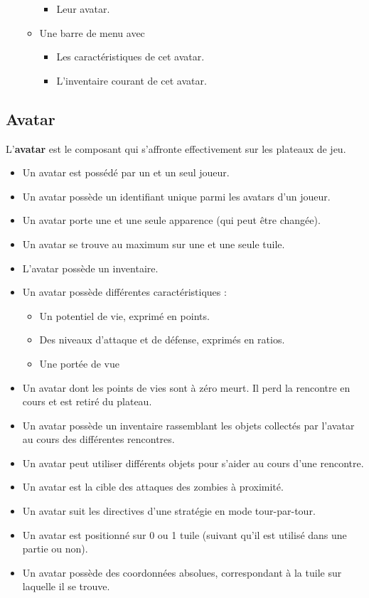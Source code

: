 \begin{itemize}
\begin{itemize}
\begin{itemize}
                        \item Leur avatar.
                    \end{itemize}
                \item Une barre de menu avec
                    \begin{itemize}
                        \item Les caractéristiques de cet avatar.
                        \item L'inventaire courant de cet avatar.
                    \end{itemize}
            \end{itemize}
    \end{itemize}
    
\subsection{Avatar}
L'\textbf{avatar} est le composant qui s'affronte effectivement sur les plateaux de jeu.
    \begin{itemize}
        \item Un avatar est possédé par un et un seul joueur.
        \item Un avatar possède un identifiant unique parmi les avatars d'un joueur.
        \item Un avatar porte une et une seule apparence (qui peut être changée).
        \item Un avatar se trouve au maximum sur une et une seule tuile.
        \item L'avatar possède un inventaire.
        \item Un avatar possède différentes caractéristiques : 
        \begin{itemize}
            \item Un potentiel de vie, exprimé en points.
            \item Des niveaux d'attaque et de défense, exprimés en ratios.
            \item Une portée de vue
        \end{itemize}
        \item Un avatar dont les points de vies sont à zéro meurt. Il perd la rencontre en cours et est retiré du plateau.
        \item Un avatar possède un inventaire rassemblant les objets collectés par l'avatar au cours des différentes rencontres.
        \item Un avatar peut utiliser différents objets pour s'aider au cours d'une rencontre.
        \item Un avatar est la cible des attaques des zombies à proximité.
        \item Un avatar suit les directives d'une stratégie en mode tour-par-tour.
        \item Un avatar est positionné sur 0 ou 1 tuile (suivant qu'il est utilisé dans une partie ou non).
        \item Un avatar possède des coordonnées absolues, correspondant à la tuile sur laquelle il se trouve.
    \end{itemize}
    
